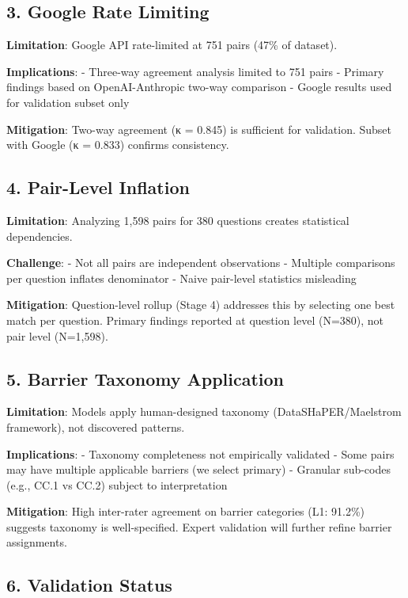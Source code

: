 \documentclass[
  letterpaper,
]{report}
\begin{document}
\subsection{3. Google Rate Limiting}\label{google-rate-limiting}

\textbf{Limitation}: Google API rate-limited at 751 pairs (47\% of
dataset).

\textbf{Implications}: - Three-way agreement analysis limited to 751
pairs - Primary findings based on OpenAI-Anthropic two-way comparison -
Google results used for validation subset only

\textbf{Mitigation}: Two-way agreement (κ = 0.845) is sufficient for
validation. Subset with Google (κ = 0.833) confirms consistency.

\subsection{4. Pair-Level Inflation}\label{pair-level-inflation}

\textbf{Limitation}: Analyzing 1,598 pairs for 380 questions creates
statistical dependencies.

\textbf{Challenge}: - Not all pairs are independent observations -
Multiple comparisons per question inflates denominator - Naive
pair-level statistics misleading

\textbf{Mitigation}: Question-level rollup (Stage 4) addresses this by
selecting one best match per question. Primary findings reported at
question level (N=380), not pair level (N=1,598).

\subsection{5. Barrier Taxonomy
Application}\label{barrier-taxonomy-application-1}

\textbf{Limitation}: Models apply human-designed taxonomy
(DataSHaPER/Maelstrom framework), not discovered patterns.

\textbf{Implications}: - Taxonomy completeness not empirically validated
- Some pairs may have multiple applicable barriers (we select primary) -
Granular sub-codes (e.g., CC.1 vs CC.2) subject to interpretation

\textbf{Mitigation}: High inter-rater agreement on barrier categories
(L1: 91.2\%) suggests taxonomy is well-specified. Expert validation will
further refine barrier assignments.

\subsection{6. Validation Status}\label{validation-status}
\end{document}
